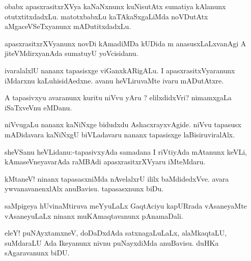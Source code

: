 \documentclass{article}
\begin{document}
\begin{mn}%
obabx apasxrasitxrXVya kaNaNxnunx kuNisutAtx sumatiya kAlanunx otutxtitxdadxLu. 
matotxbabxLu kaTAkaSxgaLiMda noVDutAtx aMgaceVSeTxyanunx mADutitxdadxLu. 
\end{mn}

\begin{mn}%
apasxrasitxrXVyanunx novDi kAmadiMDa kUDida m anasusxLaLxvanAgi A jiteVMdirxyanAda 
sumatuyU yoVcisidanu.
\end{mn}

\begin{mn}%
ivaralalxlU nananx tapasisxge viGanxkARigALu. I apasxrasitxVyaranunx iMdarxnu 
kaLuhisidAedxne. avanu heVLiruvaMte ivaru mADutAtxre.
\end{mn}

\begin{mn}%
A tapasivxyu avaranunx kuritu niVvu yAru ? elilxdidxVri? nimamxgaLa iSaTxveVnu eMDanu.
\end{mn}

\begin{mn}%
niVvugaLu nananx kaNiNxge bidudxdu AshacxrayxvAgide. niVvu tapasusx mADidavara kaNiNxgU 
biVLadavaru nananx tapasisxge laBisiruviralAlx.
\end{mn}


\begin{mn}%
sheVSanu heVLidanu:-tapasivxyAda samadana I riVtiyAda mAtanunx keVLi, kAmaseVneyavarAda 
raMBAdi apasxrasitxrXVyaru iMteMdaru.
\end{mn}

\begin{mn}%
kMtaneV! ninanx tapasasxniMda nAvelalxrU ililx baMdidedxVve. avara ywvanavanenxlAlx 
anuBavisu. tapasasxnunx biDu.
\end{mn}

\begin{mn}%
saMpigeya hUvinaMtiruva meYyuLaLx GaqtAciyu kapURrada vAsaneyaMte vAsaneyuLaLx ninanx 
muKAmaqtavanunx pAnamaDali.
\end{mn}

\begin{mn}%
eleY! puNAyxtamxneV, doDaDxdAda satxnagaLuLaLx, alaMkaqtaLU, suMdaraLU Ada Ikeyanunx nivnu 
puNayxdiMda anuBavisu. duHKa sAgaravanunx biDU.
\end{mn}
\end{document}
